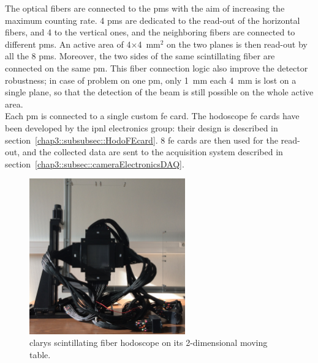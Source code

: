 The optical fibers are connected to the \glspl{pm} with the aim of increasing the maximum counting rate. 4 \glspl{pm} are dedicated to the read-out of the horizontal fibers, and 4 to the vertical ones, and the neighboring fibers are connected to different \glspl{pm}. An active area of 4$\times$4~mm$^{2}$ on the two planes is then read-out by all the 8 \glspl{pm}. Moreover, the two sides of the same scintillating fiber are connected on the same \gls{pm}. This fiber connection logic also improve the detector robustness; in case of problem on one \gls{pm}, only 1~mm each 4~mm is lost on a single plane, so that the detection of the beam is still possible on the whole active area.\\  
Each \gls{pm} is connected to a single custom \gls{fe} card. The hodoscope \gls{fe} cards have been developed by the \gls{ipnl} electronics group: their design is described in section~\ref{chap3::subsubsec::HodoFEcard}. 8 \gls{fe} cards are then used for the read-out, and the collected data are sent to the acquisition system described in section~\ref{chap3::subsec::cameraElectronicsDAQ}.

\begin{figure}[!htbp]
\centering
\includegraphics[width=0.6\textwidth]{03_GraphicFiles/chapter3_CLaRySproto/Hodoscope/Hodoscope_onTable.jpg}
\caption{\gls{clarys} scintillating fiber hodoscope on its 2-dimensional moving table.}
\label{chap3::fig::HodoscopeMain}
\end{figure}

